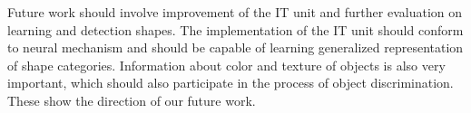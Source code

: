 \documentclass[10pt]{article}
\begin{document}
Future work should involve improvement of the IT unit and further evaluation on learning and detection shapes.
The implementation of the IT unit should conform to neural mechanism
and should be capable of learning generalized representation of shape categories.
Information about color and texture of objects is also very important,
which should also participate in the process of object discrimination.
These show the direction of our future work.



\end{document}
